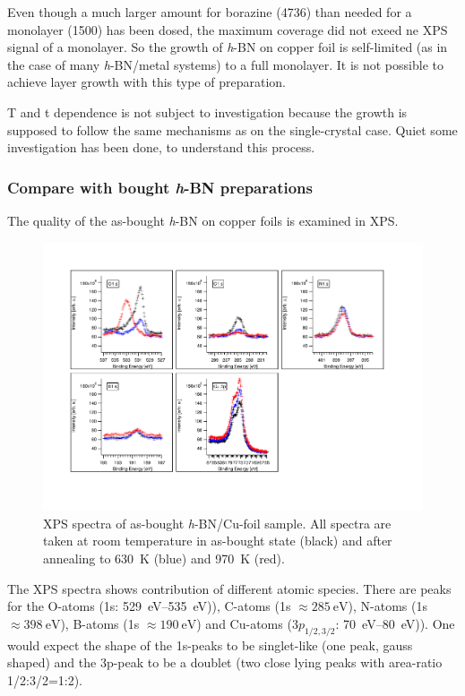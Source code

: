 Even though a much larger amount for borazine (\SI{4736}{\langmuir}) than needed for a monolayer (\SI{1500}{\langmuir}) has been dosed, the maximum coverage did not exeed ne XPS signal of a monolayer. So the growth of \textit{h}-BN on copper foil is self-limited (as in the case of many \textit{h}-BN/metal systems) to a full monolayer. It is not possible to achieve layer growth with this type of preparation.

T and t dependence is not subject to investigation because the growth is supposed to follow the same mechanisms as on the single-crystal case. Quiet some investigation has been done, \cite{orlando_epitaxial_2012,preobrajenski_monolayer_2007-1} to understand this process.

\subsubsection{Compare with bought \textit{h}-BN preparations}
The quality of the as-bought \textit{h}-BN on copper foils\cite{_graphene_2014} is examined in XPS.
\begin{landscape}
	\begin{figure}
		\includegraphics[angle=0,width=1.2\textwidth]{./images/XPS-spectra-as-bought.pdf}
		\caption{XPS spectra of as-bought \textit{h}-BN/Cu-foil sample\cite{_graphene_2014}. All spectra are taken at room temperature in as-bought state (black) and after annealing to  \SI{630}{\K} (blue) and  \SI{970}{\K} (red).}
	\end{figure}
\end{landscape}	
The XPS spectra shows contribution of different atomic species. There are peaks for the O-atoms (1s: \SIrange{529}{535}{\eV})), C-atoms (1s $\approx \SI{285}{\eV}$), N-atoms (1s $\approx \SI{398}{\eV}$), B-atoms (1s $\approx \SI{190}{\eV}$) and Cu-atoms ($3p_{1/2,3/2}$: \SIrange{70}{80}{\eV})). One would expect the shape of the 1s-peaks to be singlet-like (one peak, gauss shaped) and the 3p-peak to be a doublet (two close lying peaks with area-ratio 1/2:3/2=1:2).

